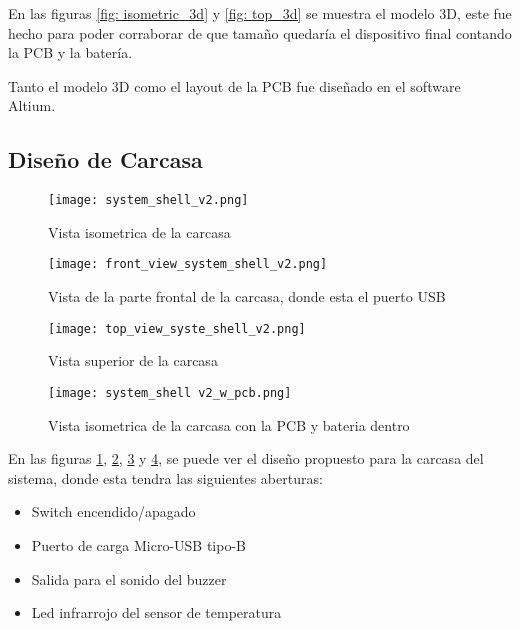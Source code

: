 En las figuras \ref{fig: isometric_3d} y \ref{fig: top_3d} se muestra el modelo 3D, este fue hecho
para poder corraborar de que tamaño quedaría el dispositivo final contando la PCB y la batería.

Tanto el modelo 3D como el layout de la PCB fue diseñado en el software Altium.
\subsection{Diseño de Carcasa}
\begin{figure}[htp!]
    \centering
    \texttt{[image: system\_shell\_v2.png]}
    \caption{Vista isometrica de la carcasa}
    \label{fig: isometric_view_shell}
\end{figure}
\FloatBarrier

\begin{figure}[htp!]
    \centering
    \texttt{[image: front\_view\_system\_shell\_v2.png]}
    \caption{Vista de la parte frontal de la carcasa, donde esta el puerto USB}
    \label{fig: front_view_shell}
\end{figure}
\FloatBarrier

\begin{figure}[htp!]
    \centering
    \texttt{[image: top\_view\_syste\_shell\_v2.png]}
    \caption{Vista superior de la carcasa}
    \label{fig: top_view_shell}
\end{figure}
\FloatBarrier

\begin{figure}[htp!]
    \centering
    \texttt{[image: system\_shell v2\_w\_pcb.png]}
    \caption{Vista isometrica de la carcasa con la PCB y bateria dentro}
    \label{isometric_view_pcb_shell}
\end{figure}
\FloatBarrier

En las figuras \ref{fig: isometric_view_shell}, \ref{fig: front_view_shell},
\ref{fig: top_view_shell} y \ref{isometric_view_pcb_shell}, se puede ver el diseño propuesto
para la carcasa del sistema, donde esta tendra las siguientes aberturas:

\begin{itemize}
    \item Switch encendido/apagado
    \item Puerto de carga Micro-USB tipo-B
    \item Salida para el sonido del buzzer
    \item Led infrarrojo del sensor de temperatura
\end{itemize}

